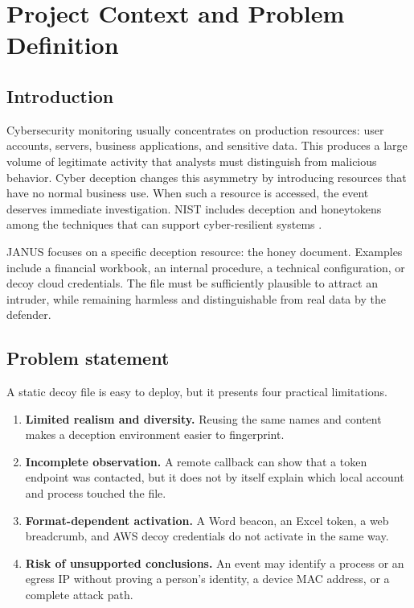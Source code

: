 \chapter{Project Context and Problem Definition}

\section{Introduction}

Cybersecurity monitoring usually concentrates on production resources: user
accounts, servers, business applications, and sensitive data. This produces a
large volume of legitimate activity that analysts must distinguish from
malicious behavior. Cyber deception changes this asymmetry by introducing
resources that have no normal business use. When such a resource is accessed,
the event deserves immediate investigation. NIST includes deception and
honeytokens among the techniques that can support cyber-resilient systems
\cite{nist800160v2}.

JANUS focuses on a specific deception resource: the honey document. Examples
include a financial workbook, an internal procedure, a technical configuration,
or decoy cloud credentials. The file must be sufficiently plausible to attract
an intruder, while remaining harmless and distinguishable from real data by the
defender.

\section{Problem statement}

A static decoy file is easy to deploy, but it presents four practical
limitations.

\begin{enumerate}[label=\arabic*.]
  \item \textbf{Limited realism and diversity.} Reusing the same names and
  content makes a deception environment easier to fingerprint.
  \item \textbf{Incomplete observation.} A remote callback can show that a
  token endpoint was contacted, but it does not by itself explain which local
  account and process touched the file.
  \item \textbf{Format-dependent activation.} A Word beacon, an Excel token,
  a web breadcrumb, and AWS decoy credentials do not activate in the same way.
  \item \textbf{Risk of unsupported conclusions.} An event may identify a
  process or an egress IP without proving a person's identity, a device MAC
  address, or a complete attack path.
\end{enumerate}


